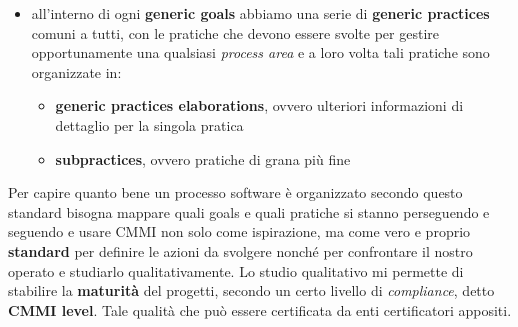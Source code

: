 \begin{itemize}
\begin{itemize}
        \end{itemize} 
    \item all'interno di ogni \textbf{generic goals} abbiamo una serie di \textbf{generic practices} comuni a tutti, con le pratiche che devono essere svolte per gestire opportunamente una qualsiasi \textit{process area} e a loro volta tali pratiche sono organizzate in: 
        \begin{itemize} 
            \item \textbf{generic practices elaborations}, ovvero ulteriori informazioni di dettaglio per la singola pratica
            \item \textbf{subpractices}, ovvero pratiche di grana più fine 
        \end{itemize} 
\end{itemize}

Per capire quanto bene un processo software è organizzato secondo questo standard bisogna mappare quali goals e quali pratiche si stanno perseguendo e seguendo e usare CMMI non solo come ispirazione, ma come vero e proprio \textbf{standard} per definire le azioni da svolgere nonché per confrontare il nostro operato e studiarlo qualitativamente. Lo studio qualitativo mi permette di stabilire la \textbf{maturità} del progetti, secondo un certo livello di \textit{compliance}, detto \textbf{CMMI level}. Tale qualità che può essere certificata da enti certificatori appositi.\\

